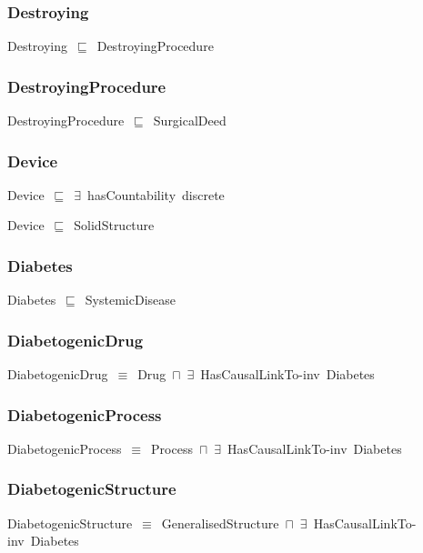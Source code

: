 \documentclass{article}
\begin{document}
\subsubsection*{Destroying}

Destroying~\ensuremath{\sqsubseteq}~DestroyingProcedure~

\subsubsection*{DestroyingProcedure}

DestroyingProcedure~\ensuremath{\sqsubseteq}~SurgicalDeed~

\subsubsection*{Device}

Device~\ensuremath{\sqsubseteq}~\ensuremath{\exists}~hasCountability~discrete~

Device~\ensuremath{\sqsubseteq}~SolidStructure~

\subsubsection*{Diabetes}

Diabetes~\ensuremath{\sqsubseteq}~SystemicDisease~

\subsubsection*{DiabetogenicDrug}

DiabetogenicDrug~\ensuremath{\equiv}~Drug~\ensuremath{\sqcap}~\ensuremath{\exists}~HasCausalLinkTo-inv~Diabetes

\subsubsection*{DiabetogenicProcess}

DiabetogenicProcess~\ensuremath{\equiv}~Process~\ensuremath{\sqcap}~\ensuremath{\exists}~HasCausalLinkTo-inv~Diabetes

\subsubsection*{DiabetogenicStructure}

DiabetogenicStructure~\ensuremath{\equiv}~GeneralisedStructure~\ensuremath{\sqcap}~\ensuremath{\exists}~HasCausalLinkTo-inv~Diabetes
\end{document}
